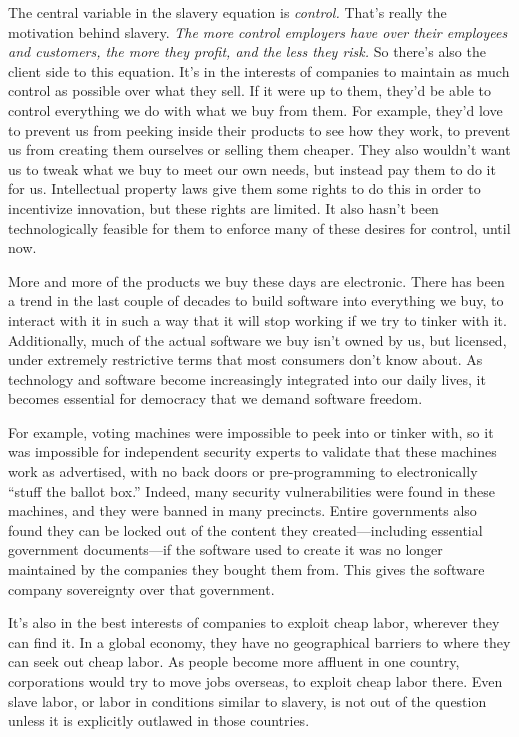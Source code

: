 The central variable in the slavery equation is \emph{control.} That's really the motivation behind slavery. \emph{The more control employers have over their employees and customers, the more they profit, and the less they risk.} So there's also the client side to this equation. It's in the interests of companies to maintain as much control as possible over what they sell. If it were up to them, they'd be able to control everything we do with what we buy from them. For example, they'd love to prevent us from peeking inside their products to see how they work, to prevent us from creating them ourselves or selling them cheaper. They also wouldn't want us to tweak what we buy to meet our own needs, but instead pay them to do it for us. Intellectual property laws give them some rights to do this in order to incentivize innovation, but these rights are limited. It also hasn't been technologically feasible for them to enforce many of these desires for control, until now.

More and more of the products we buy these days are electronic. There has been a trend in the last couple of decades to build software into everything we buy, to interact with it in such a way that it will stop working if we try to tinker with it. Additionally, much of the actual software we buy isn't owned by us, but licensed, under extremely restrictive terms that most consumers don't know about. As technology and software become increasingly integrated into our daily lives, it becomes essential for democracy that we demand software freedom.

For example, voting machines were impossible to peek into or tinker with, so it was impossible for independent security experts to validate that these machines work as advertised, with no back doors or pre-programming to electronically ``stuff the ballot box.'' Indeed, many security vulnerabilities were found in these machines, and they were banned in many precincts.\cite{black-box-voting} Entire governments also found they can be locked out of the content they created---including essential government documents---if the software used to create it was no longer maintained by the companies they bought them from. This gives the software company sovereignty over that government.\cite{wikipedia-opendocument-massachusetts}

It's also in the best interests of companies to exploit cheap labor, wherever they can find it. In a global economy, they have no geographical barriers to where they can seek out cheap labor. As people become more affluent in one country, corporations would try to move jobs overseas, to exploit cheap labor there. Even slave labor, or labor in conditions similar to slavery, is not out of the question unless it is explicitly outlawed in those countries.

